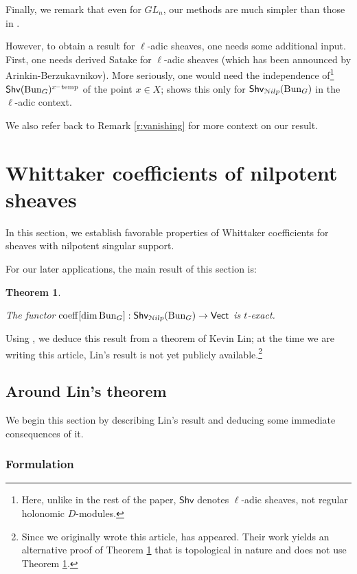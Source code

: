 \documentclass[reqno,11pt]{amsart}
\numberwithin{equation}{subsection}
\newtheorem{thm}{Theorem}[subsubsection]
\theoremstyle{remark}
\newcommand{\sN}{{\EuScript N}}
\newcommand{\on}{\operatorname}
\newcommand{\mathendash}{\text{\textendash}}
\newcommand{\Vect}{\mathsf{Vect}}
\newcommand{\Bun}{\on{Bun}}
\newcommand{\coeff}{\on{coeff}}
\newcommand{\Shv}{\mathsf{Shv}}
\newcommand{\xtemp}{x\mathendash\on{temp}}
\newcommand{\Nilp}{\sN ilp}
\begin{document}
Finally, we remark that even for $GL_n$, our methods are much 
simpler than those in \cite{vanishing}. 

However, to obtain a result for $\ell$-adic sheaves, one needs
some additional input. First, one needs derived Satake
for $\ell$-adic sheaves (which has been announced by Arinkin-Berzukavnikov).
More seriously, one would need the independence of\footnote{Here,
unlike in the rest of the paper, $\Shv$ denotes $\ell$-adic sheaves,
not regular holonomic $D$-modules.} 
$\Shv(\Bun_G)^{\xtemp}$ of the point $x \in X$; \cite{independence} shows this only 
for $\Shv_{\Nilp}(\Bun_G)$ in the $\ell$-adic context. 

We also refer back to Remark \ref{r:vanishing} for more context on our result.

\section{Whittaker coefficients of nilpotent sheaves}\label{s:coeff-exact}

In this section, we establish favorable properties of Whittaker coefficients
for sheaves with nilpotent singular support.

For our later applications, the main result of this section is:

\begin{thm}\label{t:coeff-exact}

The functor $\coeff[\dim \Bun_G]:\Shv_{\Nilp}(\Bun_G) \to \Vect$ is $t$-exact.

\end{thm}

Using \cite{agkrrv2}, we 
deduce this result from a theorem of Kevin Lin; at the time we are writing
this article, Lin's result is not yet publicly 
available.\footnote{Since we originally wrote this article, \cite{nadler-taylor}
has appeared. Their work yields an alternative proof of Theorem \ref{t:coeff-exact}
that is topological in nature and does not use Theorem \ref{t:coeff-exact}.}

\subsection{Around Lin's theorem}

We begin this section by describing 
Lin's result and deducing some immediate consequences of it.

\subsubsection{Formulation}
\end{document}

